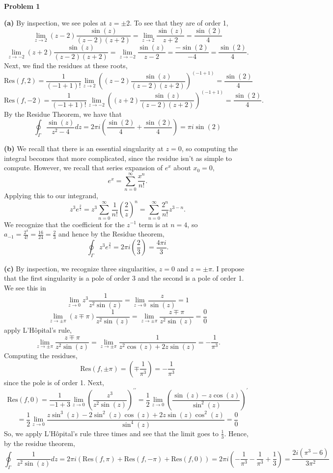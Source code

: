 \documentclass[10pt]{article}
\begin{document}
\textbf{Problem 1}

\textbf{(a)}
By inspection, we see poles at $z = \pm 2$. To see that they are of order 1,
$$\lim_{z\to 2}(z-2)\frac{\sin(z)}{(z-2)(z+2)} = \lim_{z\to 2}\frac{\sin(z)}{z+2} = \frac{\sin(2)}{4}$$
$$\lim_{z\to -2}(z+2)\frac{\sin(z)}{(z-2)(z+2)} = \lim_{z\to -2}\frac{\sin(z)}{z-2} = \frac{-\sin(2)}{-4} = \frac{\sin(2)}{4}.$$
Next, we find the residues at these roots,
$$\text{Res}(f,2) = \frac{1}{(-1+1)!}\lim_{z\to 2}\left((z-2)\frac{\sin(z)}{(z-2)(z+2)}\right)^{(-1 +1)} = \frac{\sin(2)}{4}$$
$$\text{Res}(f,-2) = \frac{1}{(-1+1)!}\lim_{z\to -2}\left((z+2)\frac{\sin(z)}{(z-2)(z+2)}\right)^{(-1 +1)} = \frac{\sin(2)}{4}.$$
By the Residue Theorem, we have that
$$\oint_{\Gamma}\frac{\sin(z)}{z^{2} - 4}dz = 2\pi i\left(\frac{\sin(2)}{4} + \frac{\sin(2)}{4}\right) = \pi i \sin(2)$$

\textbf{(b)}
We recall that there is an essential singularity at $z=0$, so computing the integral becomes that more complicated, since the residue isn't as simple to compute. However, we recall that series expansion of $e^{x}$ about $x_{0} = 0$,
$$e^{x} = \sum_{n=0}^{\infty}\frac{x^{n}}{n!}.$$
Applying this to our integrand,
$$z^{3}e^{\frac{2}{z}} = z^{3}\sum_{n=0}^{\infty}\frac{1}{n!}\left(\frac{2}{z}\right)^{n} = \sum_{n=0}^{\infty}\frac{2^{n}}{n!}z^{3-n}.$$
We recognize that the coefficient for the $z^{-1}$ term is at $n=4$, so $a_{-1} = \frac{2^{4}}{4!} = \frac{16}{24} = \frac{2}{3}$ and hence by the Residue theorem,
$$\oint_{\Gamma}z^{3}e^{\frac{2}{z}} = 2\pi i \left(\frac{2}{3}\right) = \frac{4\pi i }{3}.$$

\textbf{(c)}
By inspection, we recognize three singularities, $z=0$ and $z=\pm \pi$. I propose that the first singularity is a pole of order 3 and the second is a pole of order 1. We see this in
$$\lim_{z\to 0}z^{3}\frac{1}{z^{2}\sin(z)} = \lim_{z\to 0}\frac{z}{\sin(z)} = 1$$
$$\lim_{z\to \pm\pi}(z \mp \pi)\frac{1}{z^{2}\sin(z)} = \lim_{z\to \pm\pi}\frac{z \mp \pi}{z^{2}\sin(z)} = \frac{0}{0}$$
apply L'H\^opital's rule,
$$\lim_{z\to \pm\pi}\frac{z \mp \pi}{z^{2}\sin(z)} = \lim_{z\to \pm\pi}\frac{1}{z^{2}\cos(z) + 2z\sin(z)} = -\frac{1}{\pi^{3}}.$$
Computing the residues,
$$\text{Res}(f,\pm\pi) = \left(\mp\frac{1}{\pi^{3}}\right) = -\frac{1}{\pi^{3}}$$
since the pole is of order 1. Next,
$$\text{Res}(f,0) = \frac{1}{-1+3}\lim_{z\to 0}\left(\frac{z^{3}}{z^{2}\sin(z)}\right)^{\prime \prime} = \frac{1}{2}\lim_{z\to 0}\left(\frac{\sin(z) - z\cos(z)}{\sin^{2}(z)}\right)^{\prime}$$
$$ = \frac{1}{2}\lim_{z\to 0}\frac{z\sin^{3}(z) - 2\sin^{2}(z)\cos(z) + 2z\sin(z)\cos^{2}(z)}{\sin^{4}(z)} = \frac{0}{0}$$
So, we apply L'H\^opital's rule three times and see that the limit goes to $\frac{1}{3}$. Hence, by the residue theorem,
$$\oint_{\Gamma}\frac{1}{z^{2}\sin(z)}dz = 2\pi i \left(\text{Res}(f,\pi) + \text{Res}(f,-\pi) + \text{Res}(f,0)\right) = 2\pi i \left(-\frac{1}{\pi^{3}} - \frac{1}{\pi^{3}} + \frac{1}{3}\right) = \frac{2 i (\pi^{3} - 6)}{3\pi^{2}}$$
\end{document}
